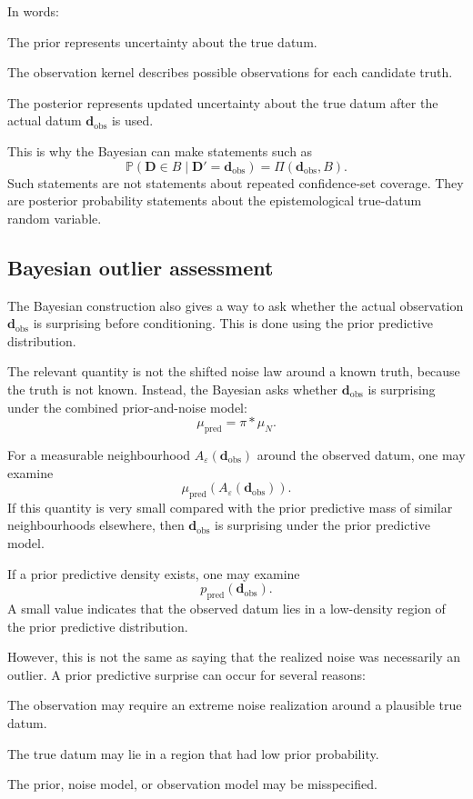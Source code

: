 \documentclass[11pt]{article}
\newcommand{\muN}{\mu_N}
\newcommand{\prior}{\pi}
\newcommand{\Drand}{\mathbf D}
\newcommand{\Dobsrand}{\mathbf D'}
\newcommand{\dobs}{\mathbf d_{\mathrm{obs}}}
\newcommand{\Prob}{\mathbb P}
\begin{document}
In words:
\begin{description}[leftmargin=2.8cm,style=nextline]
    \item[Before observation.]
    The prior represents uncertainty about the true datum.

    \item[Observation model.]
    The observation kernel describes possible observations for each candidate truth.

    \item[After observation.]
    The posterior represents updated uncertainty about the true datum after the actual datum \(\dobs\) is used.
\end{description}

This is why the Bayesian can make statements such as
\[
    \Prob(\Drand\in B\mid \Dobsrand=\dobs)
    =
    \Pi(\dobs,B).
\]
Such statements are not statements about repeated confidence-set coverage. They are posterior probability statements about the epistemological true-datum random variable.

\subsection{Bayesian outlier assessment}

The Bayesian construction also gives a way to ask whether the actual observation \(\dobs\) is surprising before conditioning. This is done using the prior predictive distribution.

The relevant quantity is not the shifted noise law around a known truth, because the truth is not known. Instead, the Bayesian asks whether \(\dobs\) is surprising under the combined prior-and-noise model:
\[
    \mu_{\mathrm{pred}}
    =
    \prior * \muN.
\]

For a measurable neighbourhood \(A_{\varepsilon}(\dobs)\) around the observed datum, one may examine
\[
    \mu_{\mathrm{pred}}\!\left(A_{\varepsilon}(\dobs)\right).
\]
If this quantity is very small compared with the prior predictive mass of similar neighbourhoods elsewhere, then \(\dobs\) is surprising under the prior predictive model.

If a prior predictive density exists, one may examine
\[
    p_{\mathrm{pred}}(\dobs).
\]
A small value indicates that the observed datum lies in a low-density region of the prior predictive distribution.

However, this is not the same as saying that the realized noise was necessarily an outlier. A prior predictive surprise can occur for several reasons:
\begin{description}[leftmargin=3.1cm,style=nextline]
    \item[Noise outlier.]
    The observation may require an extreme noise realization around a plausible true datum.

    \item[Prior surprise.]
    The true datum may lie in a region that had low prior probability.

    \item[Model failure.]
    The prior, noise model, or observation model may be misspecified.
\end{description}
\end{document}
